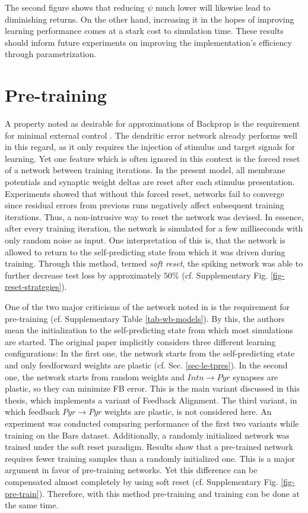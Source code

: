 The second figure shows that reducing $\psi$ much lower will likewise lead to diminishing returns. On the other hand,
increasing it in the hopes of improving learning performance comes at a stark cost to simulation time. These results
should inform future experiments on improving the implementation's efficiency through parametrization.




\section{Pre-training}


A property noted as desirable for approximations of Backprop is the requirement for minimal external control
\citep{whittington2019theories}. The dendritic error network already performs well in this regard, as it only requires
the injection of stimulus and target signals for learning. Yet one feature which is often ignored in this context is the
forced reset of a network between training iterations. In the present model, all membrane potentials and synaptic weight
deltas are reset after each stimulus presentation. Experiments showed that without this forced reset, networks fail to
converge since residual errors from previous runs negatively affect subsequent training iterations. Thus, a
non-intrusive way to reset the network was devised. In essence, after every training iteration, the network is simulated
for a few milliseconds with only random noise as input. One interpretation of this is, that the network is allowed to
return to the self-predicting state from which it was driven during training. Through this method, termed \textit{soft
reset}, the spiking network was able to further decrease test loss by approximately $50\%$ (cf. Supplementary Fig.
\ref{fig-reset-strategies}).



One of the two major criticisms of the network noted in \citep{whittington2019theories} is the requirement for
pre-training (cf. Supplementary Table \ref{tab-wb-models}). By this, the authors mean the initialization to the
self-predicting state from which most simulations are started. The original paper implicitly considers three different
learning configurations: In the first one, the network starts from the self-predicting state and only feedforward
weights are plastic (cf. Sec. \ref{sec-le-tpres}). In the second one, the network starts from random weights and $Intn
\rightarrow Pyr$ synapses are plastic, so they can minimize FB error. This is the main variant discussed in this thesis,
which implements a variant of Feedback Alignment. The third variant, in which feedback $Pyr \rightarrow Pyr$ weights are
plastic, is not considered here. An experiment was conducted comparing performance of the first two variants while
training on the Bars dataset. Additionally, a randomly initialized network was trained under the soft reset paradigm.
Results show that a pre-trained network requires fewer training samples than a randomly initialized one. This is a major
argument in favor of pre-training networks. Yet this difference can be compensated almost completely by using soft reset
(cf. Supplementary Fig. \ref{fig-pre-train}). Therefore, with this method pre-training and training can be done at the
same time.

